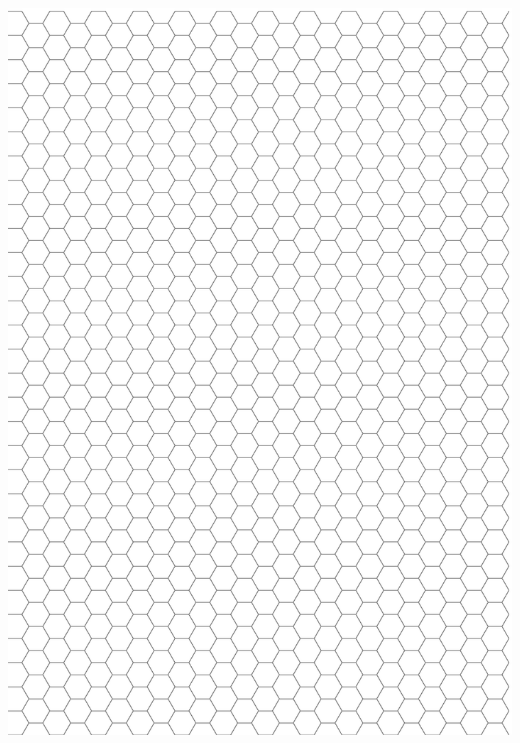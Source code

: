\documentclass[10pt, portrait,letterpaper]{article}
\begin{document}
\onecolumn

\begin{center}
	\includegraphics[scale=.98]{hexagon.0.eps}
\end{center}

\newpage
\end{document}
